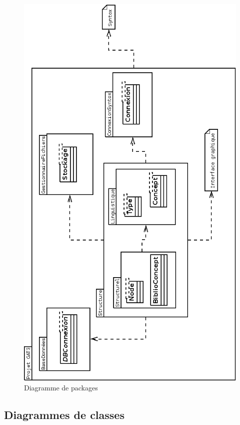 \documentclass[12pt]{report}
\begin{document}
\begin{figure}[h!]
\begin{center}
\includegraphics[scale=0.40]{DiagPackages.png}
\caption{Diagramme de packages}
\end{center}
\end{figure}

\subsection{Diagrammes de classes}
\end{document}
